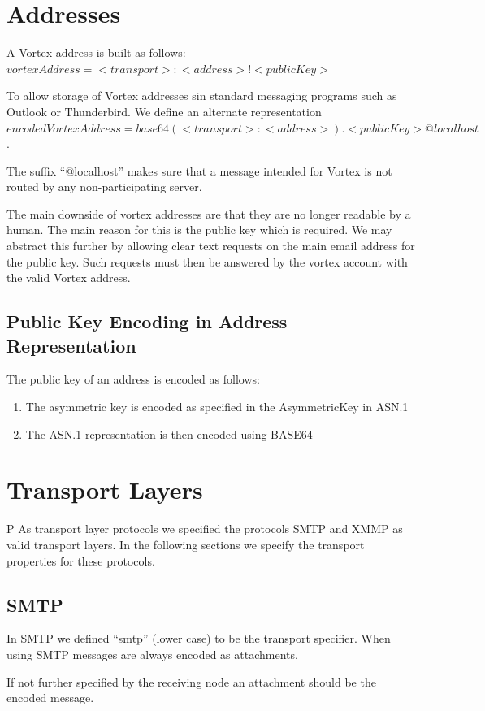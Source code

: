 \section{Addresses}
A Vortex address is built as follows: $vortexAddress=<transport>:<address>!<publicKey>$

To allow storage of Vortex addresses sin standard messaging programs such as Outlook or Thunderbird. We define an alternate representation $encodedVortexAddress=base64(<transport>:<address>).<publicKey>@localhost$. 

The suffix ``@localhost'' makes sure that a message intended for Vortex is not routed by any non-participating server.

The main downside of vortex addresses are that they are no longer readable by a human. The main reason for this is the public key which is required. We may abstract this further by allowing clear text requests on the main email address for the public key. Such requests must then be answered by the vortex account with the valid Vortex address.

\subsection{Public Key Encoding in Address Representation}
The public key of an address is encoded as follows:
\begin{enumerate}
	\item The asymmetric key is encoded as specified in the AsymmetricKey in ASN.1
	\item The ASN.1 representation is then encoded using BASE64
\end{enumerate}	

\section{Transport Layers}                                          P
As transport layer protocols we specified the protocols SMTP and XMMP as valid transport layers. In the following sections we specify the transport properties for these protocols.

\subsection{SMTP}
In SMTP we defined ``smtp'' (lower case) to be the transport specifier. When using SMTP messages are always encoded as attachments. 

If not further specified by the receiving node an attachment should be the encoded message. 


